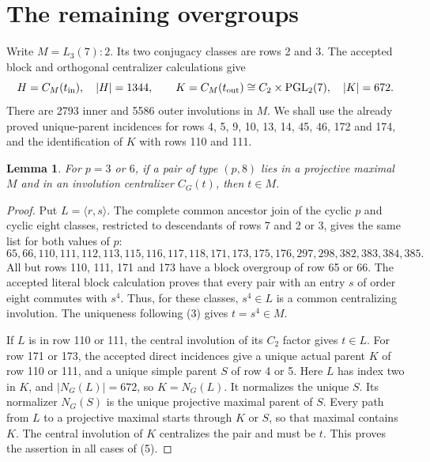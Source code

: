 \documentclass[11pt,a4paper]{article}
\newtheorem{lemma}{Lemma}\newtheorem{theorem}{Theorem}
\begin{document}
\section*{The remaining overgroups}
Write $M=L_3(7):2$. Its two conjugacy classes are rows 2 and 3.
The accepted block and orthogonal centralizer calculations give
\[
 H=C_M(t_{\rm in}),\quad |H|=1344,\qquad
 K=C_M(t_{\rm out})\cong C_2\times\mathrm{PGL}_2(7),\quad |K|=672.
\]
There are 2793 inner and 5586 outer involutions in $M$.
We shall use the already proved unique-parent incidences for rows
4, 5, 9, 10, 13, 14, 45, 46, 172 and 174, and the identification of
$K$ with rows 110 and 111.

\begin{lemma}\label{inside}
For $p=3$ or $6$, if a pair of type $(p,8)$ lies in a projective maximal
$M$ and in an involution centralizer $C_G(t)$, then $t\in M$.
\end{lemma}
\begin{proof}
Put $L=\langle r,s\rangle$. The complete common ancestor join of the
cyclic $p$ and cyclic eight classes, restricted to descendants of
rows 7 and 2 or 3, gives the same list for both values of $p$:
\[
65,66,110,111,112,113,115,116,117,118,171,173,175,176,
297,298,382,383,384,385.                                      \tag{5}
\]
All but rows 110, 111, 171 and 173 have a block overgroup of row 65
or 66. The accepted literal block calculation proves that every
pair with an entry $s$ of order eight commutes with $s^4$.
Thus, for these classes, $s^4\in L$ is a common centralizing
involution. The uniqueness following (3) gives $t=s^4\in M$.

If $L$ is in row 110 or 111, the central involution of its $C_2$
factor gives $t\in L$. For row 171 or 173, the accepted direct
incidences give a unique actual parent $K$ of row 110 or 111, and
a unique simple parent $S$ of row 4 or 5. Here $L$ has index two
in $K$, and $|N_G(L)|=672$, so $K=N_G(L)$. It normalizes the unique
$S$. Its normalizer $N_G(S)$ is the unique projective maximal
parent of $S$. Every path from $L$ to a projective maximal starts
through $K$ or $S$, so that maximal contains $K$. The central
involution of $K$ centralizes the pair and must be $t$. This proves
the assertion in all cases of (5).
\end{proof}
\end{document}
